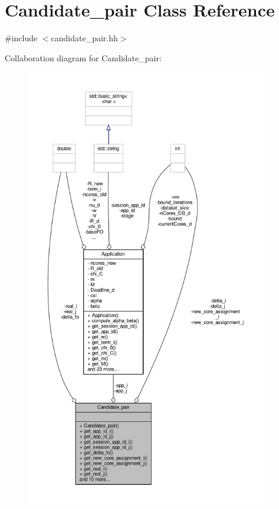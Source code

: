 \hypertarget{classCandidate__pair}{\section{Candidate\-\_\-pair Class Reference}
\label{classCandidate__pair}
}


{\ttfamily \#include $<$candidate\-\_\-pair.\-hh$>$}



Collaboration diagram for Candidate\-\_\-pair\-:
\nopagebreak
\begin{figure}[H]
\begin{center}
\leavevmode
\includegraphics[height=550pt]{classCandidate__pair__coll__graph}
\end{center}
\end{figure}
